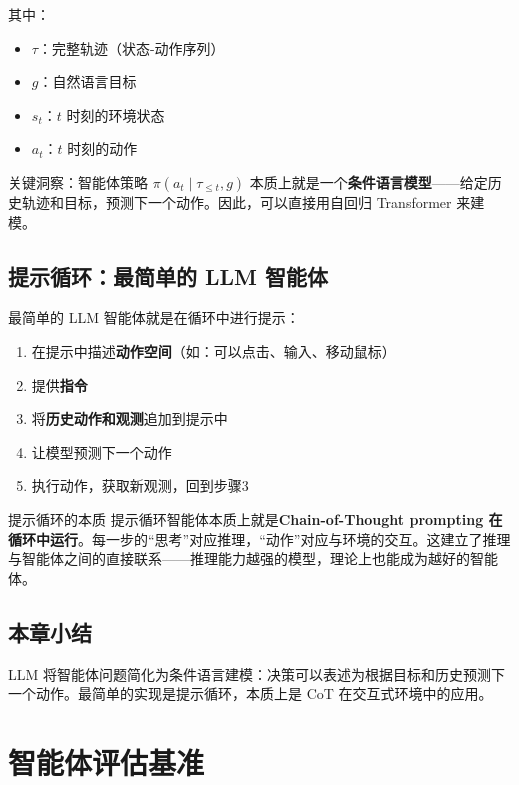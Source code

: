 \documentclass[a4paper]{article}
\begin{document}
其中：
\begin{itemize}
    \item $\tau$：完整轨迹（状态-动作序列）
    \item $g$：自然语言目标
    \item $s_t$：$t$ 时刻的环境状态
    \item $a_t$：$t$ 时刻的动作
\end{itemize}

关键洞察：智能体策略 $\pi(a_t \mid \tau_{\leq t}, g)$ 本质上就是一个\textbf{条件语言模型}——给定历史轨迹和目标，预测下一个动作。因此，可以直接用自回归 Transformer 来建模。

\subsection{提示循环：最简单的 LLM 智能体}

最简单的 LLM 智能体就是在循环中进行提示：

\begin{enumerate}
    \item 在提示中描述\textbf{动作空间}（如：可以点击、输入、移动鼠标）
    \item 提供\textbf{指令}
    \item 将\textbf{历史动作和观测}追加到提示中
    \item 让模型预测下一个动作
    \item 执行动作，获取新观测，回到步骤3
\end{enumerate}





\begin{knowledgebox}{提示循环的本质}
提示循环智能体本质上就是\textbf{Chain-of-Thought prompting 在循环中运行}。每一步的``思考''对应推理，``动作''对应与环境的交互。这建立了推理与智能体之间的直接联系——推理能力越强的模型，理论上也能成为越好的智能体。
\end{knowledgebox}

\subsection{本章小结}

LLM 将智能体问题简化为条件语言建模：决策可以表述为根据目标和历史预测下一个动作。最简单的实现是提示循环，本质上是 CoT 在交互式环境中的应用。


\section{智能体评估基准}
\end{document}
